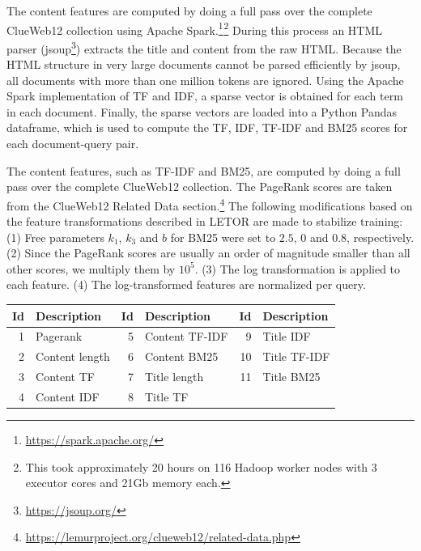 The content features are computed by doing a full pass over the complete ClueWeb12 collection using Apache Spark.\footnote{\url{https://spark.apache.org/}}$^{ }$\footnote{This took approximately 20 hours on 116 Hadoop worker nodes with 3 executor cores and 21Gb memory each.}
During this process an HTML parser (jsoup\footnote{\url{https://jsoup.org/}}) extracts the title and content from the raw HTML.
Because the HTML structure in very large documents cannot be parsed efficiently by jsoup, all documents with more than one million tokens are ignored.
Using the Apache Spark implementation of TF and IDF, a sparse vector is obtained for each term in each document. Finally, the sparse vectors are loaded into a Python Pandas dataframe, which is used to compute the TF, IDF, TF-IDF and BM25 scores for each document-query pair.
\fi

The content features, such as TF-IDF and BM25, are computed by doing a full pass over the complete ClueWeb12 collection.
The PageRank scores are taken from the ClueWeb12 Related Data section.\footnote{\url{https://lemurproject.org/clueweb12/related-data.php}}
The following modifications based on the feature transformations described in LETOR are made to stabilize training:
(1) Free parameters $k_1$, $k_3$ and $b$ for BM25 were set to $2.5$, $0$ and $0.8$, respectively. 
(2) Since the PageRank scores are usually an order of magnitude smaller than all other scores, we multiply them by $10^5$.
(3) The log transformation is applied to each feature.
(4) The log-transformed features are normalized per query.  

\begin{table}[t]
\centering
{}  \label{tab:setdescription} 
\begin{tabular}{rlrlrl}
\toprule
Id & Description & Id & Description & Id & Description    \\ 
\midrule
1  & Pagerank  & 5  & Content TF-IDF  & 9  & Title IDF   \\
2  & Content length & 6  & Content BM25   & 10 & Title TF-IDF   \\
3  & Content TF  & 7  & Title length & 11 & Title BM25  \\
4  & Content IDF & 8  & Title TF  & & \\
\bottomrule
\end{tabular}
\end{table}

